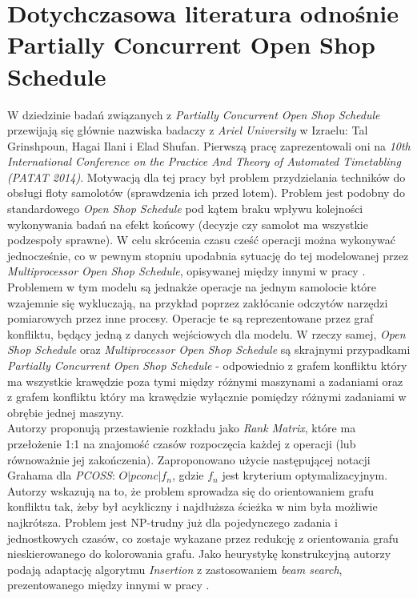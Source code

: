 \documentclass[brudnopis]{xmgr}
\begin{document}
\section{Dotychczasowa literatura odnośnie Partially Concurrent Open Shop Schedule}
W dziedzinie badań związanych z \emph{Partially Concurrent Open Shop Schedule} przewijają się głównie nazwiska badaczy z \emph{Ariel University} w Izraelu: Tal Grinshpoun, Hagai Ilani i Elad Shufan. Pierwszą pracę \cite{1PCOSS:2014:P} zaprezentowali oni na \emph{10th International Conference on the Practice And Theory of Automated Timetabling (PATAT 2014)}. Motywacją dla tej pracy był problem przydzielania techników do obsługi floty samolotów (sprawdzenia ich przed lotem). Problem jest podobny do standardowego \emph{Open Shop Schedule} pod kątem braku wpływu kolejności wykonywania badań na efekt końcowy (decyzje czy samolot ma wszystkie podzespoły sprawne). W celu skrócenia czasu cześć operacji można wykonywać jednocześnie, co w pewnym stopniu upodabnia sytuację do tej modelowanej przez \emph{Multiprocessor Open Shop Schedule}, opisywanej między innymi w pracy \cite{MPOSS:2020:X}. Problemem w tym modelu są jednakże operacje na jednym samolocie które wzajemnie się wykluczają, na przykład poprzez zakłócanie odczytów narzędzi pomiarowych przez inne procesy. Operacje te są reprezentowane przez graf konfliktu, będący jedną z danych wejściowych dla modelu. W rzeczy samej, \emph{Open Shop Schedule} oraz \emph{Multiprocessor Open Shop Schedule} są skrajnymi przypadkami \emph{Partially Concurrent Open Shop Schedule} - odpowiednio z grafem konfliktu który ma wszystkie krawędzie poza tymi między różnymi maszynami a zadaniami oraz z grafem konfliktu który ma krawędzie wyłącznie pomiędzy różnymi zadaniami w obrębie jednej maszyny. \\
Autorzy proponują przestawienie rozkładu jako \emph{Rank Matrix}, które ma przełożenie 1:1 na znajomość czasów rozpoczęcia każdej z operacji (lub równoważnie jej zakończenia). Zaproponowano użycie następującej notacji Grahama dla \emph{PCOSS}: $O|pconc|f_n$, gdzie $f_n$ jest kryterium optymalizacyjnym. Autorzy wskazują na to, że problem sprowadza się do orientowaniem grafu konfliktu tak, żeby był acykliczny i najdłuższa ścieżka w nim była możliwie najkrótsza. Problem jest NP-trudny już dla pojedynczego zadania i jednostkowych czasów, co zostaje wykazane przez redukcję z orientowania grafu nieskierowanego do kolorowania grafu. Jako heurystykę konstrukcyjną autorzy podają adaptację algorytmu \emph{Insertion} z zastosowaniem \emph{beam search}, prezentowanego między innymi w pracy \cite{CHOSS:1993:X}.
\end{document}
